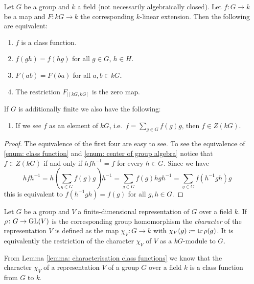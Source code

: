 \begin{lemma} \label{lemma: characterisation class functions}
  Let $G$ be a group and $k$ a field (not necessarily algebraically closed).
  Let $f \colon G \to k$ be a map and $F \colon kG \to k$ the corresponding $k$-linear extension.
  Then the following are equivalent:
  \begin{enumerate}[label=\emph{\roman*)}, leftmargin=*]
    \item \label{enum: class function}
      $f$ is a class function.
    \item
      $f(gh) = f(hg)$ for all $g \in G$, $h \in H$.
    \item
      $F(ab) = F(ba)$ for all $a, b \in kG$.
    \item
      The restriction $F_{|[kG,kG]}$ is the zero map.
  \end{enumerate}
  If $G$ is additionally finite we also have the following:
  \begin{enumerate}[label=\emph{\roman*)}, leftmargin=*, resume]
    \item \label{enum: center of group algebra}
      If we see $f$ as an element of $kG$, i.e.\ $f = \sum_{g \in G} f(g) g$, then $f \in Z(kG)$.
  \end{enumerate}
\end{lemma}
\begin{proof}
  The equivalence of the first four are easy to see.
  To see the equivalence of \ref{enum: class function} and \ref{enum: center of group algebra} notice that $f \in Z(kG)$ if and only if $hfh^{-1} = f$ for every $h \in G$.
  Since we have
    \[
        h f h^{-1}
      = h\left( \sum_{g \in G} f(g) g \right) h^{-1}
      = \sum_{g \in G} f(g) hgh^{-1}
      = \sum_{g \in G} f(h^{-1} g h) g
    \]
    this is equivalent to $f(h^{-1} g h) = f(g)$ for all $g, h \in G$.
\end{proof}


\begin{definition}
  Let $G$ be a group and $V$ a finite-dimensional representation of $G$ over a field $k$. If $\rho \colon G \to \operatorname{GL}(V)$ is the corresponding group homomorphism the \emph{character} of the representation $V$ is defined as the map $\chi_V \colon G \to k$ with $\chi_V(g) \coloneqq \operatorname{tr} \rho(g)$. It is equivalently the restriction of the character $\chi_V$ of $V$ as a $kG$-module to $G$.
\end{definition}


From Lemma \ref{lemma: characterisation class functions} we know that the character $\chi_V$ of a representation $V$ of a group $G$ over a field $k$ is a class function from $G$ to $k$.


